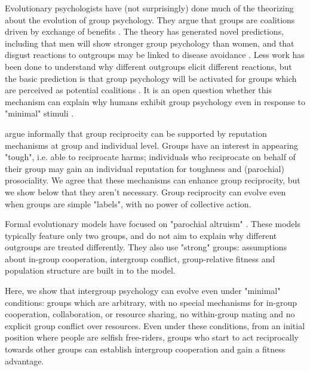 \documentclass[12pt,a4paper]{article}
\begin{document}
Evolutionary psychologists have (not surprisingly) done much of the theorizing about the evolution of group psychology. They argue that groups are coalitions driven by exchange of benefits \parencite{tooby2010groups,kurzban2015managing}. The theory has generated novel predictions, including that men will show stronger group psychology than women, and that disgust reactions to outgroups may be linked to disease avoidance \parencite{van2009guns}. Less work has been done to understand why different outgroups elicit different reactions, but the basic prediction is that group psychology will be activated for groups which are perceived as potential coalitions \parencite{kurzban2001can}. It is an open question whether this mechanism can explain why humans exhibit group psychology even in response to "minimal" stimuli \cite{tajfel1971social,dunham2018mere}. 

\textcite{columbus2023parochial} argue informally that group reciprocity can
be supported by reputation mechanisms at group and individual level. Groups
have an interest in appearing "tough", i.e. able to reciprocate harms; individuals
who reciprocate on behalf of their group may gain an individual reputation for
toughness and (parochial) prosociality. We agree that these mechanisms can enhance
group reciprocity, but we show below that they aren't necessary. Group reciprocity 
can evolve even when groups are simple "labels", with no power of collective 
action. 

Formal evolutionary models have focused on "parochial altruism" \parencite{choi2007coevolution,smirnov2007ancestral,rusch2014evolutionary}. These models typically feature only two groups, and do not aim to explain why different outgroups are treated differently. They also use "strong" groups: assumptions about in-group cooperation, intergroup conflict, group-relative fitness and population structure are built in to the model. 

Here, we show that intergroup psychology can evolve even under "minimal" 
conditions: groups which are arbitrary, with no special mechanisms for in-group
cooperation, collaboration, or resource sharing, no within-group mating and no
explicit group conflict over resources. Even under these conditions, from an 
initial position where people are selfish free-riders, groups who start to act 
reciprocally towards other groups can establish intergroup cooperation and gain 
a fitness advantage. 
\end{document}
